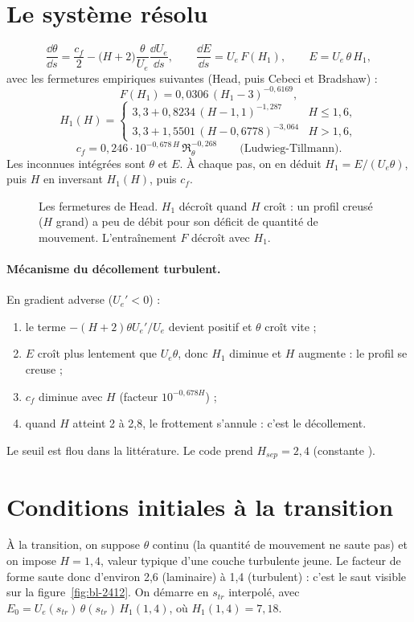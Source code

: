 \section{Le système résolu}
\[
\frac{\dd\theta}{\dd s}=\frac{c_f}{2}-\big(H+2\big)\frac{\theta}{U_e}\frac{\dd U_e}{\dd s},\qquad
\frac{\dd E}{\dd s}=U_e\,F(H_1),\qquad E=U_e\,\theta\,H_1,
\]
avec les fermetures empiriques suivantes (Head, puis Cebeci et Bradshaw) :
\[
F(H_1)=0{,}0306\,(H_1-3)^{-0{,}6169},
\]
\[
H_1(H)=\begin{cases}3{,}3+0{,}8234\,(H-1{,}1)^{-1{,}287} & H\le1{,}6,\\ 3{,}3+1{,}5501\,(H-0{,}6778)^{-3{,}064} & H>1{,}6,\end{cases}
\]
\[
c_f=0{,}246\cdot10^{-0{,}678\,H}\,\Re_\theta^{-0{,}268}\qquad\text{(Ludwieg-Tillmann).}
\]
Les inconnues intégrées sont $\theta$ et $E$. À chaque pas, on en déduit $H_1=E/(U_e\theta)$, puis $H$ en inversant $H_1(H)$, puis $c_f$.

\begin{figure}[htbp]
\centering

\caption{Les fermetures de Head. $H_1$ décroît quand $H$ croît : un profil creusé ($H$ grand) a peu de débit pour son déficit de quantité de mouvement. L'entraînement $F$ décroît avec $H_1$.}\label{fig:head-fermeture}
\end{figure}

\paragraph{Mécanisme du décollement turbulent.} En gradient adverse ($U_e'<0$) :
\begin{enumerate}
\item le terme $-(H+2)\theta U_e'/U_e$ devient positif et $\theta$ croît vite ;
\item $E$ croît plus lentement que $U_e\theta$, donc $H_1$ diminue et $H$ augmente : le profil se creuse ;
\item $c_f$ diminue avec $H$ (facteur $10^{-0{,}678H}$) ;
\item quand $H$ atteint 2 à 2,8, le frottement s'annule : c'est le décollement.
\end{enumerate}
Le seuil est flou dans la littérature. Le code prend $H_{sep}=2{,}4$ (constante ).

\section{Conditions initiales à la transition}
À la transition, on suppose $\theta$ continu (la quantité de mouvement ne saute pas) et on impose $H=1{,}4$, valeur typique d'une couche turbulente jeune. Le facteur de forme saute donc d'environ 2,6 (laminaire) à 1,4 (turbulent) : c'est le saut visible sur la figure~\ref{fig:bl-2412}. On démarre en $s_{tr}$ interpolé, avec $E_0=U_e(s_{tr})\,\theta(s_{tr})\,H_1(1{,}4)$, où $H_1(1{,}4)=7{,}18$.

